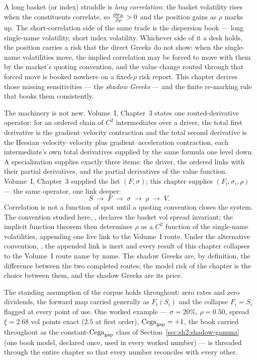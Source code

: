 A long basket (or index) straddle is \emph{long correlation}: the basket
volatility rises when the constituents correlate, so
$\frac{\partial \sigma_B}{\partial \rho} > 0$ and the position gains as $\rho$ marks up. The
short-correlation side of the same trade is the dispersion book --- long
single-name volatility, short index volatility. Whichever side of it a desk
holds, the position carries a risk that the direct Greeks do not show: when
the single-name volatilities move, the implied correlation may be forced to
move with them by the market's quoting convention, and the value change
routed through that forced move is booked nowhere on a fixed-$\rho$ risk
report. This chapter derives those missing sensitivities --- the
\emph{shadow Greeks} --- and the finite re-marking rule that books them
consistently.

The machinery is not new. Volume~I, Chapter~3 states one routed-derivative
operator: for an ordered chain of $C^2$ intermediates over a driver, the
total first derivative is the gradient--velocity contraction and the total
second derivative is the Hessian--velocity--velocity plus
gradient--acceleration contraction, each intermediate's own total
derivatives supplied by the same formula one level down. A specialization
supplies exactly three items: the driver, the ordered links with their
partial derivatives, and the partial derivatives of the value function.
Volume~I, Chapter~3 supplied the list $(F, \sigma)$; this chapter supplies
$(F_i, \sigma_i, \rho)$ --- the same operator, one link deeper:
\[
  S \;\longrightarrow\; F \;\longrightarrow\; \sigma
    \;\longrightarrow\; \rho \;\longrightarrow\; V.
\]
Correlation is not a function of spot until a quoting convention closes the
system. The convention studied here, \stickycvc{}, declares the basket vol
spread invariant; the implicit function theorem then determines $\rho$ as a
$C^2$ function of the single-name volatilities, appending one live link to
the Volume~I route. Under the alternative convention, \stickyrho{}, the
appended link is inert and every result of this chapter collapses to the
Volume~I route name by name. The shadow Greeks are, by definition, the
difference between the two completed routes; the model risk of the chapter
is the choice between them, and the shadow Greeks are its price.

The standing assumption of the corpus holds throughout: zero rates
and zero dividends, the forward map carried generally as $F_i(S_i)$ and the
collapse $F_i = S_i$ flagged at every point of use. One worked example ---
$\sigma = 20\%$, $\rho = 0.50$, spread $\xi = 2.68$ vol points exact
($2.5$ at first order),
$\mathrm{Cega}_{\mathrm{gap}} = +1$, the book carried throughout as the constant-$\mathrm{Cega}_{\mathrm{gap}}$
class of Section~\ref{sec:sh2:shadow-gamma} (one book model, declared once,
used in every worked number) --- is threaded through the entire chapter so
that every number reconciles with every other.

